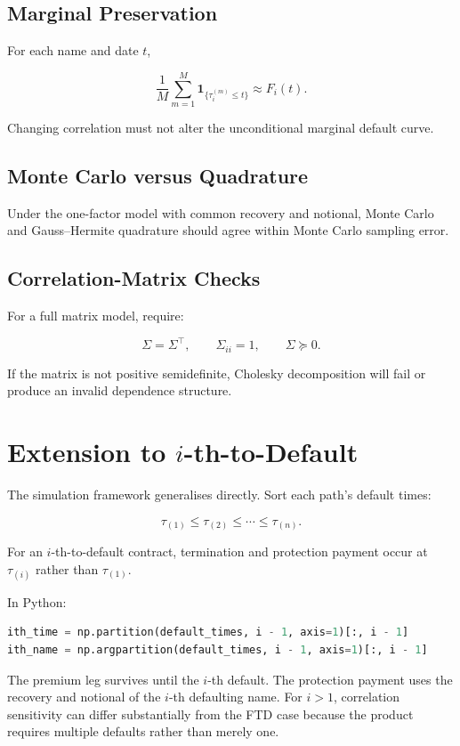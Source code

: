 \documentclass[11pt,a4paper]{article}
\newcommand{\ind}{\mathbf{1}}
\begin{document}
\subsection{Marginal Preservation}

For each name and date $t$,

\[
\frac{1}{M}
\sum_{m=1}^{M}
\ind_{\{\tau_i^{(m)}\leq t\}}
\approx
F_i(t).
\]

Changing correlation must not alter the unconditional marginal default curve.

\subsection{Monte Carlo versus Quadrature}

Under the one-factor model with common recovery and notional, Monte Carlo and Gauss--Hermite quadrature should agree within Monte Carlo sampling error.

\subsection{Correlation-Matrix Checks}

For a full matrix model, require:

\[
\Sigma=\Sigma^\top,
\qquad
\Sigma_{ii}=1,
\qquad
\Sigma\succeq0.
\]

If the matrix is not positive semidefinite, Cholesky decomposition will fail or produce an invalid dependence structure.

\section{Extension to $i$-th-to-Default}

The simulation framework generalises directly. Sort each path's default times:

\[
\tau_{(1)}
\leq
\tau_{(2)}
\leq
\cdots
\leq
\tau_{(n)}.
\]

For an $i$-th-to-default contract, termination and protection payment occur at $\tau_{(i)}$ rather than $\tau_{(1)}$.

In Python:

\begin{lstlisting}[language=Python]
ith_time = np.partition(default_times, i - 1, axis=1)[:, i - 1]
ith_name = np.argpartition(default_times, i - 1, axis=1)[:, i - 1]
\end{lstlisting}

The premium leg survives until the $i$-th default. The protection payment uses the recovery and notional of the $i$-th defaulting name. For $i>1$, correlation sensitivity can differ substantially from the FTD case because the product requires multiple defaults rather than merely one.
\end{document}
